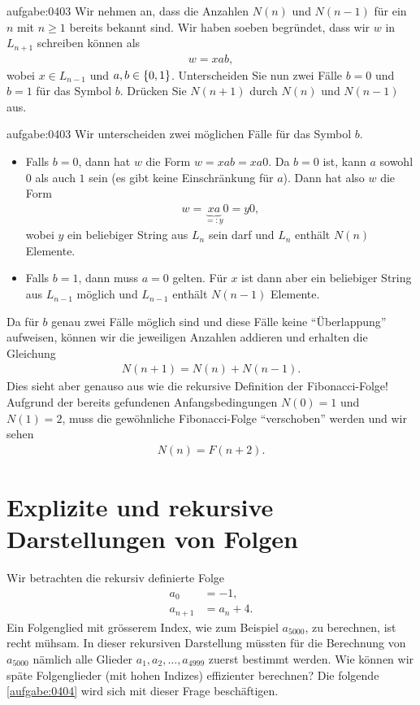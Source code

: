 \begin{aufgabe}{aufgabe:0403}
Wir nehmen an, dass die Anzahlen $N(n)$ und $N(n-1)$ für ein $n$ mit $n\geq 1$ bereits bekannt sind. Wir haben soeben begründet, dass wir $w$ in $L_{n+1}$ schreiben können als
\begin{align*}
    w = xab,
\end{align*}
wobei $x\in L_{n-1}$ und $a,b\in\left\{0,1\right\}$. Unterscheiden Sie nun zwei Fälle $b = 0$ und $b = 1$ für das Symbol $b$. Drücken Sie $N(n+1)$ durch $N(n)$ und $N(n-1)$ aus.
\end{aufgabe}
\begin{antwort}{aufgabe:0403}
    Wir unterscheiden zwei möglichen Fälle für das Symbol $b$.
    \begin{itemize}
        \item Falls $b = 0$, dann hat $w$ die Form $w = xab = xa0$. Da $b = 0$ ist, kann $a$ sowohl $0$ als auch $1$ sein (es gibt keine Einschränkung für $a$). Dann hat also $w$ die Form
        \begin{align*}
            w = \underbrace{xa}_{=:y}0 = y0,
        \end{align*}
        wobei $y$ ein beliebiger String aus $L_n$ sein darf und $L_n$ enthält $N(n)$ Elemente.
        \item  Falls $b = 1$, dann muss $a = 0$ gelten. Für $x$ ist dann aber ein beliebiger String aus $L_{n-1}$ möglich und $L_{n-1}$ enthält $N(n-1)$ Elemente.
    \end{itemize}
    Da für $b$ genau zwei Fälle möglich sind und diese Fälle keine \enquote{Überlappung} aufweisen, können wir die jeweiligen Anzahlen addieren und erhalten die Gleichung
    \begin{align}\label{eq:rekkurenz}
        N(n+1) = N(n) + N(n-1).
    \end{align}
    Dies sieht aber genauso aus wie die rekursive Definition der Fibonacci-Folge! Aufgrund der bereits gefundenen Anfangsbedingungen $N(0) = 1$ und $N(1) = 2$, muss die gewöhnliche Fibonacci-Folge \enquote{verschoben} werden und wir sehen
    \begin{align*}
        N(n) = F(n+2).
    \end{align*}
\end{antwort}

\section{Explizite und rekursive Darstellungen von Folgen}
Wir betrachten die rekursiv definierte Folge
\begin{align*}
    a_0 &= -1, \\
    a_{n+1} &= a_n + 4.
\end{align*}
Ein Folgenglied mit grösserem Index, wie zum Beispiel $a_{5000}$, zu berechnen, ist recht mühsam. In dieser rekursiven Darstellung müssten für die Berechnung von 
$a_{5000}$ nämlich alle Glieder $a_{1}, a_{2}, \ldots, a_{4999}$ zuerst bestimmt werden. Wie können wir späte Folgenglieder (mit hohen Indizes) effizienter berechnen? Die folgende \cref{aufgabe:0404} wird sich mit dieser Frage beschäftigen.

